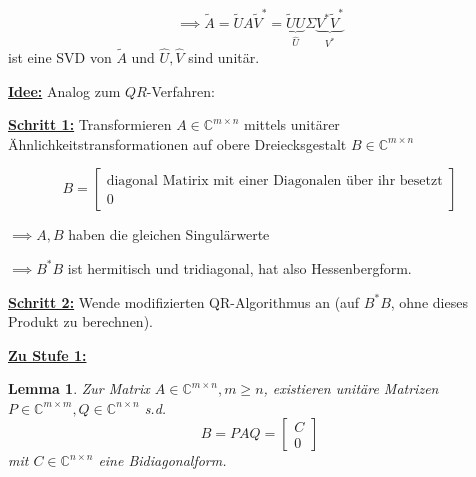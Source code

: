\documentclass{book}
\newtheorem{lemma}[algorithm]{Lemma}
\def\C{\mathbb{C}}
\begin{document}
            \[\implies \tilde{A}=\tilde{U}A\tilde{V}^*=\underbrace{\tilde{U}U}_{\hat{U}}\Sigma \underbrace{V^*\tilde{V}^*}_{V^*}\]
            ist eine SVD von $\tilde{A}$ und $\hat{U},\hat{V}$ sind unitär.

            \underline{\textbf{Idee:}} Analog zum $QR$-Verfahren:

            \underline{\textbf{Schritt 1:}}  Transformieren $A\in\C^{m\times n}$ mittels unitärer 
            Ähnlichkeitstransformationen  auf obere Dreiecksgestalt $B\in\C^{m\times n}$

            \begin{equation*}
                B=\begin{bmatrix}
                    \text{diagonal Matirix mit einer Diagonalen über ihr besetzt}\\ %
                    0
                \end{bmatrix}
            \end{equation*}

            $\implies A,B$ haben die gleichen Singulärwerte

            $\implies B^*B$ ist hermitisch und tridiagonal, hat also Hessenbergform.

            \underline{\textbf{Schritt 2:}} Wende modifizierten QR-Algorithmus an (auf $B^*B$, ohne 
            dieses Produkt zu berechnen).

            \underline{\textbf{Zu Stufe 1:}}

            \begin{lemma}\label{l4.28}
                Zur Matrix $A\in\C^{m\times n},m\geq n$, existieren unitäre Matrizen $P\in\C^{m\times m},Q\in\C^{n\times n}$ s.d. 
                \[B=PAQ=\begin{bmatrix}
                    C\\0
                \end{bmatrix}\]
                mit $C\in\C^{n\times n}$ eine Bidiagonalform.
            \end{lemma}
\end{document}
